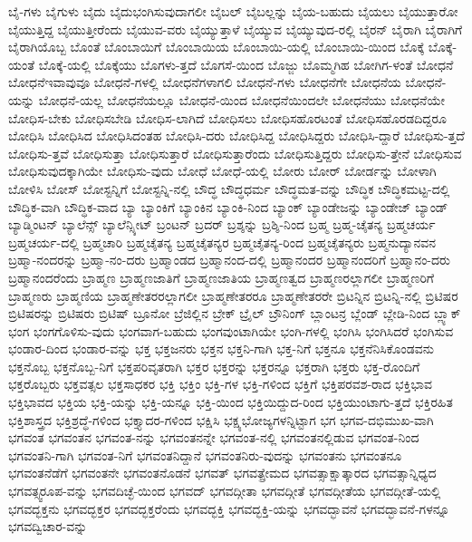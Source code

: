 {ಬೈ-ಗಳು
ಬೈಗುಳು
ಬೈದು
ಬೈದುಭಂಗಿಸುವುದಾಗಲೀ
ಬೈಬಲ್
ಬೈಬಲ್ಲನ್ನು
ಬೈಯ-ಬಹುದು
ಬೈಯಲು
ಬೈಯುತ್ತಾರೋ
ಬೈಯುತ್ತಿದ್ದ
ಬೈಯುತ್ತೀರೆಂದು
ಬೈಯುವ-ವರು
ಬೈಯ್ಯುತ್ತಾಳೆ
ಬೈಯ್ಯುವ
ಬೈಯ್ಯುವುದ-ರಲ್ಲಿ
ಬೈರನ್
ಬೈರಾಗಿ
ಬೈರಾಗಿಗೆ
ಬೈರಾಗಿಯೊಬ್ಬ
ಬೊಂತೆ
ಬೊಂಬಾಯಿಗೆ
ಬೊಂಬಾಯಿಯ
ಬೊಂಬಾಯಿ-ಯಲ್ಲಿ
ಬೊಂಬಾಯಿ-ಯಿಂದ
ಬೊಕ್ಕೆ
ಬೊಕ್ಕೆ-ಯಂತೆ
ಬೊಕ್ಕೆ-ಯಲ್ಲಿ
ಬೊಕ್ಕೆಯು
ಬೊಗಳು-ತ್ತದೆ
ಬೊಗಸೆ-ಯಿಂದ
ಬೊಜ್ಜು
ಬೊಮ್ಮಗಿಹ
ಬೋಗಿಗ-ಳಂತೆ
ಬೋಧನೆ
ಬೋಧನೆಇವಾವುವೂ
ಬೋಧನೆ-ಗಳಲ್ಲಿ
ಬೋಧನೆಗಳಾಗಲಿ
ಬೋಧನೆ-ಗಳು
ಬೋಧನೆಗೇ
ಬೋಧನೆಯ
ಬೋಧನೆ-ಯನ್ನು
ಬೋಧನೆ-ಯಲ್ಲ
ಬೋಧನೆಯಲ್ಲೂ
ಬೋಧನೆ-ಯಿಂದ
ಬೋಧನೆಯಿಂದಲೇ
ಬೋಧನೆಯು
ಬೋಧನೆಯೇ
ಬೋಧಿಸ-ಬೇಕು
ಬೋಧಿಸಬೇಡಿ
ಬೋಧಿಸ-ಲಾಗಿದೆ
ಬೋಧಿಸಲು
ಬೋಧಿಸಹೊರಟಂತೆ
ಬೋಧಿಸಹೊರಡದಿದ್ದರೂ
ಬೋಧಿಸಿ
ಬೋಧಿಸಿದ
ಬೋಧಿಸಿದಂತಹ
ಬೋಧಿಸಿ-ದರು
ಬೋಧಿಸಿದ್ದ
ಬೋಧಿಸಿದ್ದರು
ಬೋಧಿಸಿ-ದ್ದಾರೆ
ಬೋಧಿಸು-ತ್ತದೆ
ಬೋಧಿಸು-ತ್ತವೆ
ಬೋಧಿಸುತ್ತಾ
ಬೋಧಿಸುತ್ತಾರೆ
ಬೋಧಿಸುತ್ತಾರೆಂದು
ಬೋಧಿಸುತ್ತಿದ್ದರು
ಬೋಧಿಸು-ತ್ತೇನೆ
ಬೋಧಿಸುವ
ಬೋಧಿಸುವುದಕ್ಕಾಗಿಯೇ
ಬೋಧಿಸು-ವುದು
ಬೋಧೆ
ಬೋಧೆ-ಯಲ್ಲಿ
ಬೋರು
ಬೋರ್
ಬೋರ್ಡನ್ನು
ಬೋಳಾಗಿ
ಬೋಳಿಸಿ
ಬೋಸ್
ಬೋಸ್ಟನ್ನಿಗೆ
ಬೋಸ್ಟನ್ನಿ-ನಲ್ಲಿ
ಬೌದ್ಧ
ಬೌದ್ಧಧರ್ಮ
ಬೌದ್ಧಮತ-ವನ್ನು
ಬೌದ್ಧಿಕ
ಬೌದ್ಧಿಕಮಟ್ಟ-ದಲ್ಲಿ
ಬೌದ್ಧಿಕ-ವಾಗಿ
ಬೌದ್ಧಿಕ-ವಾದ
ಬ್ಯಾ
ಬ್ಯಾಂಕಿಗೆ
ಬ್ಯಾಂಕಿನ
ಬ್ಯಾಂಕಿ-ನಿಂದ
ಬ್ಯಾಂಕ್
ಬ್ಯಾಂಡೇಜನ್ನು
ಬ್ಯಾಂಡೇಜ್
ಬ್ಯಾಂಡ್
ಬ್ಯಾಡ್ಮಿಂಟನ್
ಬ್ಯಾಲೆನ್ಸ್
ಬ್ಯಾಲೆನ್ಸ್ಶೀಟ್
ಬ್ರಂಟನ್
ಬ್ರದರ್
ಬ್ರಶ್ಶನ್ನು
ಬ್ರಶ್ಶಿ-ನಿಂದ
ಬ್ರಹ್ಮ
ಬ್ರಹ್ಮ-ಚೈತನ್ಯ
ಬ್ರಹ್ಮಚರ್ಯ
ಬ್ರಹ್ಮಚರ್ಯ-ದಲ್ಲಿ
ಬ್ರಹ್ಮಚಾರಿ
ಬ್ರಹ್ಮಚೈತನ್ಯ
ಬ್ರಹ್ಮಚೈತನ್ಯರ
ಬ್ರಹ್ಮಚೈತನ್ಯ-ರಿಂದ
ಬ್ರಹ್ಮಚೈತನ್ಯರು
ಬ್ರಹ್ಮನುದ್ಯಾನವನ
ಬ್ರಹ್ಮಾ-ನಂದರನ್ನು
ಬ್ರಹ್ಮಾ-ನಂ-ದರು
ಬ್ರಹ್ಮಾಂಡದ
ಬ್ರಹ್ಮಾನಂದ-ದಲ್ಲಿ
ಬ್ರಹ್ಮಾನಂದರ
ಬ್ರಹ್ಮಾನಂದರಿಗೆ
ಬ್ರಹ್ಮಾನಂ-ದರು
ಬ್ರಹ್ಮಾನಂದರೆಂದು
ಬ್ರಾಹ್ಮಣ
ಬ್ರಾಹ್ಮಣಜಾತಿಗೆ
ಬ್ರಾಹ್ಮಣಜಾತಿಯ
ಬ್ರಾಹ್ಮಣತ್ವದ
ಬ್ರಾಹ್ಮಣರಲ್ಲಾಗಲೀ
ಬ್ರಾಹ್ಮಣರಿಗೆ
ಬ್ರಾಹ್ಮಣರು
ಬ್ರಾಹ್ಮಣಿಯ
ಬ್ರಾಹ್ಮಣೇತರರಲ್ಲಾಗಲೀ
ಬ್ರಾಹ್ಮಣೇತರರೂ
ಬ್ರಾಹ್ಮಣೇತರರೇ
ಬ್ರಿಟನ್ನಿನ
ಬ್ರಿಟನ್ನಿ-ನಲ್ಲಿ
ಬ್ರಿಟಿಷರ
ಬ್ರಿಟಿಷರನ್ನು
ಬ್ರಿಟಿಷರು
ಬ್ರಿಟಿಷ್
ಬ್ರೂನೋ
ಬ್ರೆಜಿಲ್ಲಿನ
ಬ್ರೇಕ್
ಬ್ರೈಲ್
ಬ್ರೌನಿಂಗ್
ಬ್ಲಾಂಟನ್ರ
ಬ್ಲೆಂಡ್
ಬ್ಲೇಡಿ-ನಿಂದ
ಬ್ಲ್ಯಾಕ್
ಭಂಗ
ಭಂಗಗೊಳಿಸು-ವುದು
ಭಂಗವಾಗ-ಬಹುದು
ಭಂಗವುಂಟಾಗಿಯೇ
ಭಂಗಿ-ಗಳಲ್ಲಿ
ಭಂಗಿಸಿ
ಭಂಗಿಸಿದರೆ
ಭಂಗಿಸುವ
ಭಂಡಾರ-ದಿಂದ
ಭಂಡಾರ-ವನ್ನು
ಭಕ್ತ
ಭಕ್ತಜನರು
ಭಕ್ತನ
ಭಕ್ತನಿ-ಗಾಗಿ
ಭಕ್ತ-ನಿಗೆ
ಭಕ್ತನೂ
ಭಕ್ತನೆನಿಸಿಕೊಂಡವನು
ಭಕ್ತನೊಬ್ಬ
ಭಕ್ತನೊಬ್ಬ-ನಿಗೆ
ಭಕ್ತಪರಿವೃತರಾಗಿ
ಭಕ್ತರ
ಭಕ್ತರನ್ನು
ಭಕ್ತರನ್ನೂ
ಭಕ್ತರಾಗಿ
ಭಕ್ತರು
ಭಕ್ತ-ರೊಂದಿಗೆ
ಭಕ್ತರೊಬ್ಬರು
ಭಕ್ತವತ್ಸಲ
ಭಕ್ತಸಾಧಕರ
ಭಕ್ತಿ
ಭಕ್ತಿಂ
ಭಕ್ತಿ-ಗಳ
ಭಕ್ತಿ-ಗಳಿಂದ
ಭಕ್ತಿಗೆ
ಭಕ್ತಿಪರವಶ-ರಾದ
ಭಕ್ತಿಭಾವ
ಭಕ್ತಿಭಾವದ
ಭಕ್ತಿಯ
ಭಕ್ತಿ-ಯನ್ನು
ಭಕ್ತಿ-ಯನ್ನೂ
ಭಕ್ತಿ-ಯಿಂದ
ಭಕ್ತಿಯಿದ್ದುದ-ರಿಂದ
ಭಕ್ತಿಯುಂಟಾಗು-ತ್ತದೆ
ಭಕ್ತಿರಹಿತ
ಭಕ್ತಿಶಾಸ್ತ್ರದ
ಭಕ್ತಿಶ್ರದ್ಧೆ-ಗಳಿಂದ
ಭಕ್ತ್ಯಾದರ-ಗಳಿಂದ
ಭಕ್ಷಿಸಿ
ಭಕ್ಷ್ಯಭೋಜ್ಯಗಳನ್ನಿಟ್ಟಾಗ
ಭಗ
ಭಗವ-ದಭಿಮುಖ-ವಾಗಿ
ಭಗವಂತ
ಭಗವಂತನ
ಭಗವಂತ-ನನ್ನು
ಭಗವಂತನನ್ನೇ
ಭಗವಂತ-ನಲ್ಲಿ
ಭಗವಂತನಲ್ಲಿಡುವ
ಭಗವಂತ-ನಿಂದ
ಭಗವಂತನಿ-ಗಾಗಿ
ಭಗವಂತ-ನಿಗೆ
ಭಗವಂತನಿದ್ದಾನೆ
ಭಗವಂತನಿರು-ವುದನ್ನು
ಭಗವಂತನು
ಭಗವಂತನೂ
ಭಗವಂತನೆಡೆಗೆ
ಭಗವಂತನೇ
ಭಗವಂತನೊಡನೆ
ಭಗವತ್
ಭಗವತ್ಪ್ರೇಮದ
ಭಗವತ್ಸಾಕ್ಷಾತ್ಕಾರದ
ಭಗವತ್ಸಾನ್ನಿಧ್ಯದ
ಭಗವತ್ಸ್ವರೂಪ-ವನ್ನು
ಭಗವದಿಚ್ಛೆ-ಯಿಂದ
ಭಗವದ್
ಭಗವದ್ಗೀತಾ
ಭಗವದ್ಗೀತೆ
ಭಗವದ್ಗೀತೆಯ
ಭಗವದ್ಗೀತೆ-ಯಲ್ಲಿ
ಭಗವದ್ಭಕ್ತನು
ಭಗವದ್ಭಕ್ತರ
ಭಗವದ್ಭಕ್ತರೆಂದು
ಭಗವದ್ಭಕ್ತಿ
ಭಗವದ್ಭಕ್ತಿ-ಯನ್ನು
ಭಗವದ್ಭಾವನೆ
ಭಗವದ್ಭಾವನೆ-ಗಳನ್ನೂ
ಭಗವದ್ವಿಚಾರ-ವನ್ನು
}
